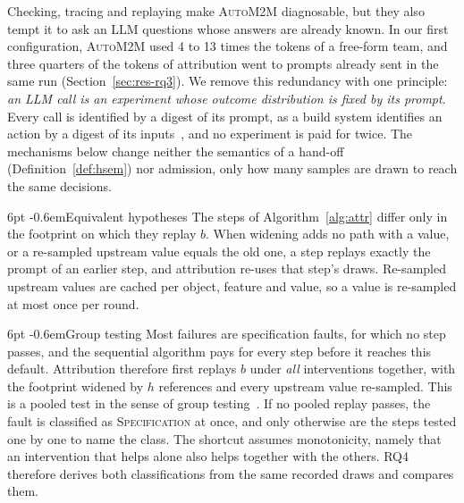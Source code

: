 \documentclass[pdflatex,sn-mathphys-num]{sn-jnl}
\makeatletter
\theoremstyle{thmstyleone}%
\theoremstyle{thmstyletwo}%
\theoremstyle{thmstylethree}%
\newcommand{\auto}{\textsc{AutoM2M}}
\renewcommand\paragraph{\@startsection{paragraph}{4}{\z@}%
  {6pt \@plus 2pt \@minus 1pt}{-0.6em}{\normalfont\normalsize\bfseries}}
\makeatother
\begin{document}
Checking, tracing and replaying make \auto{} diagnosable, but they also tempt
it to ask an LLM questions whose answers are already known. In our first
configuration, \auto{} used 4 to 13 times the tokens of a free-form team, and
three quarters of the tokens of attribution went to prompts already sent in the
same run (Section~\ref{sec:res-rq3}). We remove this redundancy with one
principle: \emph{an LLM call is an experiment whose outcome distribution is
fixed by its prompt}. Every call is identified by a digest of its prompt, as a
build system identifies an action by a digest of its
inputs~\cite{mokhov2018build}, and no experiment is paid for twice. The
mechanisms below change neither the semantics of a hand-off
(Definition~\ref{def:hsem}) nor admission, only how many samples are drawn to
reach the same decisions.

\paragraph{Equivalent hypotheses} The steps of Algorithm~\ref{alg:attr} differ
only in the footprint on which they replay $b$. When widening adds no path with
a value, or a re-sampled upstream value equals the old one, a step replays
exactly the prompt of an earlier step, and attribution re-uses that step's
draws. Re-sampled upstream values are cached per object, feature and value, so
a value is re-sampled at most once per round.

\paragraph{Group testing} Most failures are specification faults, for which no
step passes, and the sequential algorithm pays for every step before it reaches
this default. Attribution therefore first replays $b$ under \emph{all}
interventions together, with the footprint widened by $h$ references and every
upstream value re-sampled. This is a pooled test in the sense of group
testing~\cite{dorfman1943,hwang1972}. If no pooled replay passes, the fault is
classified as \textsc{Specification} at once, and only otherwise are the steps
tested one by one to name the class. The shortcut assumes monotonicity, namely
that an intervention that helps alone also helps together with the others. RQ4
therefore derives both classifications from the same recorded draws and
compares them.
\end{document}
